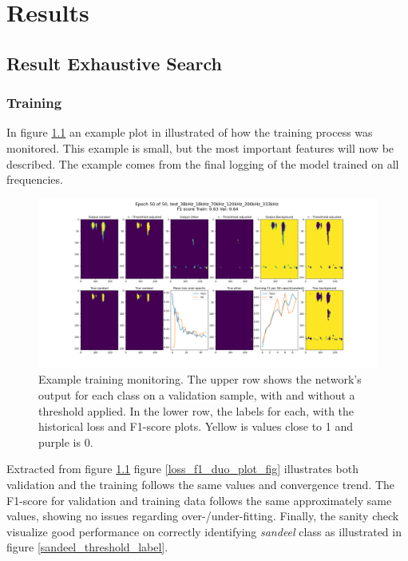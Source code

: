 \chapter{Results} \label{results}

\section{Result Exhaustive Search}
    
    \subsection{Training}
        In figure \ref{training_overveiw_fig} an example plot in illustrated of how the training process was monitored. This example is small, but the most important features will now be described. The example comes from the final logging of the model trained on all frequencies.
        \clearpage
        \begin{figure}[H]
            \centering
            \includegraphics[scale=0.3]{figures/epoch_50_test_38kHz_18kHz_70kHz_120kHz_200kHz_333kHz.png}
            \caption[Training example monitoring]{Example training monitoring. The upper row shows the network's output for each class on a validation sample, with and without a threshold applied. In the lower row, the labels for each, with the historical loss and F1-score plots. Yellow is values close to 1 and purple is 0.}
          	\medskip 
            \label{training_overveiw_fig}
        \end{figure}
        
        
        Extracted from figure \ref{training_overveiw_fig} figure \ref{loss_f1_duo_plot_fig} illustrates both validation and the training follows the same values and convergence trend. The F1-score for validation and training data follows the same approximately same values, showing no issues regarding over-/under-fitting. Finally, the sanity check visualize good performance on correctly identifying \textit{sandeel} class as illustrated in figure \ref{sandeel_threshold_label}.%
        
